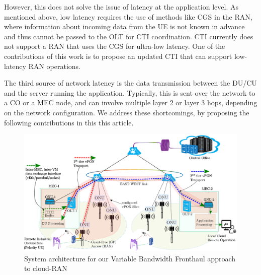 \documentclass[a4paper, oneside, twocolumn, notitlepage, 10pt]{extarticle_ecoc}
\begin{document}
 	However, this does not solve the issue of latency at the application level. As mentioned above, low latency requires the use of methods like \ac{CGS} in the RAN, where information about incoming data from the UE is not known in advance and thus cannot be passed to the OLT for CTI coordination. %
 	CTI currently does not support a RAN that uses the CGS for ultra-low latency. One of the contributions of this work is to propose an updated CTI that can support low-latency RAN operations. %
 	
 	The third source of network latency is the data transmission between the DU/CU and the server running the application. Typically, this is sent over the network to a \ac{CO} or a \ac{MEC} node, and can involve multiple layer 2 or layer 3 hops, depending on the network configuration. %
 	We address these shortcomings, by proposing the following contributions in this this article.
 	\begin{figure}[h]
    	\includegraphics[clip, trim={0, 0, 0, 0}, width=\linewidth]{./Figures/SystemArc}
    	\caption{System architecture for our Variable Bandwidth Fronthaul approach to cloud-RAN}
    	\label{fig:SystemArc}
    \end{figure}
	
\end{document}
